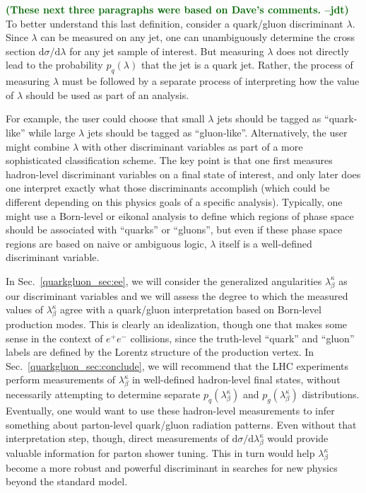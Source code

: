 \documentclass[11pt]{cernrep}
\newcommand{\jdt}[1]{\textbf{\textcolor{darkgreen}{(#1 --jdt)}}}
\begin{document}
\jdt{These next three paragraphs were based on Dave's comments.}
To better understand this last definition, consider a quark/gluon discriminant $\lambda$.  Since $\lambda$ can be measured on any jet, one can unambiguously determine the cross section $\text{d} \sigma / \text{d} \lambda$ for any jet sample of interest.  But measuring $\lambda$ does not directly lead to the probability $p_q(\lambda)$ that the jet is a quark jet.  Rather, the process of measuring $\lambda$ must be followed by a separate process of interpreting how the value of $\lambda$ should be used as part of an analysis.

For example, the user could choose that small $\lambda$ jets should be tagged as ``quark-like'' while large $\lambda$ jets should be tagged as ``gluon-like''. Alternatively, the user might combine $\lambda$ with other discriminant variables as part of a more sophisticated classification scheme.  The key point is that one first measures hadron-level discriminant variables on a final state of interest, and only later does one interpret exactly what those discriminants accomplish (which could be different depending on this physics goals of a specific analysis).  Typically, one might use a Born-level or eikonal analysis to define which regions of phase space should be associated with ``quarks'' or ``gluons'', but even if these phase space regions are based on naive or ambiguous logic, $\lambda$ itself is a well-defined discriminant variable.

In Sec.~\ref{quarkgluon_sec:ee}, we will consider the generalized
angularities $\lambda_{\beta}^\kappa$ as our discriminant variables
and we will assess the degree to which the measured values of
$\lambda_{\beta}^\kappa$ agree with a quark/gluon interpretation based
on Born-level production modes.  This is clearly an idealization,
though one that makes some sense in the context of $e^+e^-$
collisions, since the truth-level ``quark'' and ``gluon'' labels are
defined by the Lorentz structure of the production vertex.  In
Sec.~\ref{quarkgluon_sec:conclude}, we will recommend that the LHC
experiments perform measurements of $\lambda_\beta^\kappa$ in
well-defined hadron-level final states, without necessarily attempting
to determine separate $p_q(\lambda_\beta^\kappa)$ and
$p_g(\lambda_\beta^\kappa)$ distributions.  Eventually, one would want
to use these hadron-level measurements to infer something about
parton-level quark/gluon radiation patterns.  Even without that
interpretation step, though, direct measurements of $\text{d} \sigma /
\text{d} \lambda_\beta^\kappa$ would provide valuable information for
parton shower tuning.  This in turn would help $\lambda_\beta^\kappa$ become a more robust and powerful discriminant in searches for new physics beyond the standard model. 
\end{document}
